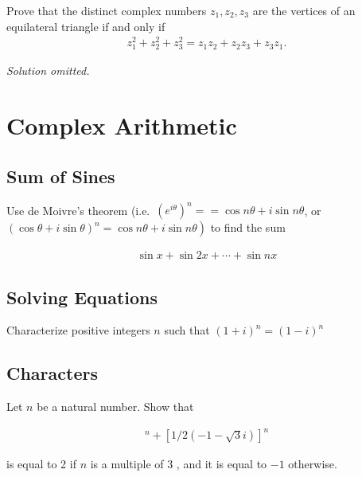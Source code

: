 \begin{problem}[?]

Prove that the distinct complex numbers \(z_1, z_2, z_3\) are the
vertices of an equilateral triangle if and only if
\begin{align*}
z_{1}^{2}+z_{2}^{2}+z_{3}^{2}=z_{1} z_{2}+z_{2} z_{3}+z_{3} z_{1}
.\end{align*}

\end{problem}

\emph{Solution omitted.}

\hypertarget{complex-arithmetic}{%
\section{Complex Arithmetic}\label{complex-arithmetic}}

\hypertarget{sum-of-sines}{%
\subsection{Sum of Sines}\label{sum-of-sines}}

Use de Moivre's theorem
(i.e.~\(\left(e^{i \theta}\right)^{n}==\cos n \theta+i \sin n \theta\),
or
\(\left.(\cos \theta+i \sin \theta)^{n}=\cos n \theta+i \sin n \theta\right)\)
to find the sum

\begin{align*}
\sin x+\sin 2 x+\cdots+\sin n x
\end{align*}

\hypertarget{solving-equations}{%
\subsection{Solving Equations}\label{solving-equations}}

Characterize positive integers \(n\) such that \((1+i)^{n}=(1-i)^{n}\)

\hypertarget{characters}{%
\subsection{Characters}\label{characters}}

Let \(n\) be a natural number. Show that

\begin{align*}
[1 / 2(-1+\sqrt{3} i)]^{n}+[1 / 2(-1-\sqrt{3} i)]^{n}
\end{align*}

is equal to 2 if \(n\) is a multiple of 3 , and it is equal to \(-1\)
otherwise.

